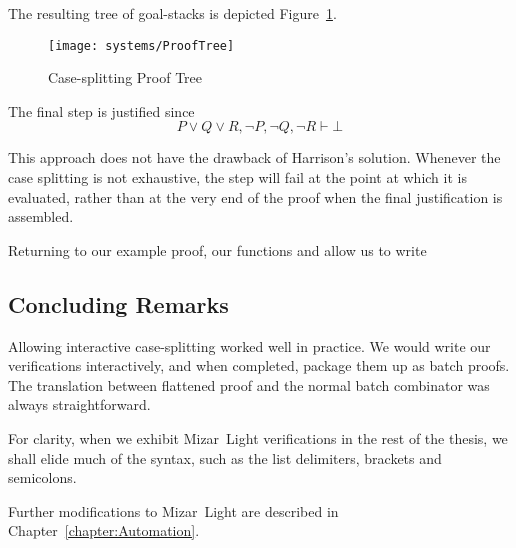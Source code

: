 The resulting tree of goal-stacks is depicted Figure~\ref{fig:CaseProofTree}. 

\begin{figure}
\begin{center}
\texttt{[image: systems/ProofTree]}
\end{center}
\caption{Case-splitting Proof Tree}
\label{fig:CaseProofTree}
\end{figure}

The final  step is justified since 
\begin{displaymath} 
P \vee Q \vee R, \neg P, \neg Q, \neg R \vdash \bot
\end{displaymath}

This approach does not have the drawback of Harrison's solution. Whenever the case splitting is not exhaustive, the  step will fail at the point at which it is evaluated, rather than at the very end of the proof when the final justification is assembled. 

Returning to our example proof, our functions  and  allow us to write

\vspace{0.5cm}
\begin{minipage}{\linewidth}
  \footnotesize






\end{minipage}
\vspace{0.5cm}

\subsection{Concluding Remarks}
Allowing interactive case-splitting worked well in practice. We would write our verifications interactively, and when completed, package them up as batch proofs. The translation between flattened proof and the normal batch  combinator was always straightforward.

For clarity, when we exhibit Mizar~Light verifications in the rest of the thesis, we shall elide much of the syntax, such as the list delimiters, brackets and semicolons. 

Further modifications to Mizar~Light are described in Chapter~\ref{chapter:Automation}.

